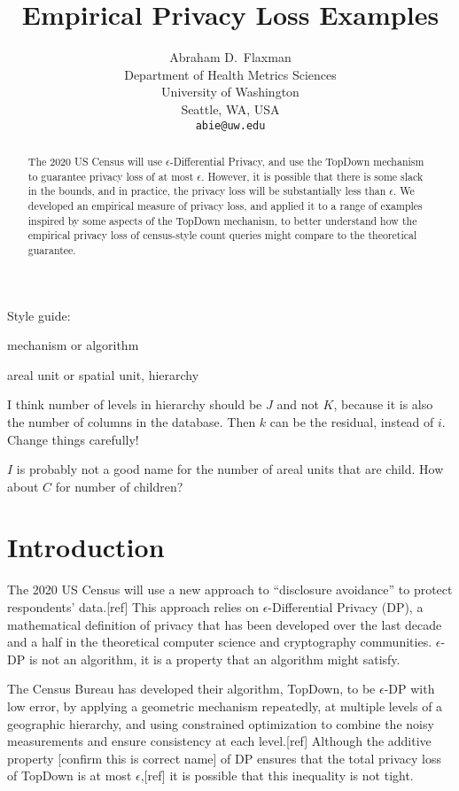 \documentclass{article}
\title{Empirical Privacy Loss Examples}
\author{%
  Abraham D.~Flaxman \\
  Department of Health Metrics Sciences\\
  University of Washington\\
  Seattle, WA, USA \\
  \texttt{abie@uw.edu} \\
}
\begin{document}
\maketitle

\begin{abstract}
  The 2020 US Census will use $\epsilon$-Differential Privacy, and use the TopDown mechanism to guarantee privacy loss of at most $\epsilon$.  However, it is possible that there is some slack in the bounds, and in practice, the privacy loss will be substantially less than $\epsilon$.  We developed an empirical measure of privacy loss, and applied it to a range of examples inspired by some aspects of the TopDown mechanism, to better understand how the empirical privacy loss of census-style count queries might compare to the theoretical guarantee.
\end{abstract}

Style guide:

mechanism or algorithm

areal unit or spatial unit, hierarchy

I think number of levels in hierarchy should be $J$ and not $K$, because it is also the number of columns in the database.  Then $k$ can be the residual, instead of $i$.  Change things carefully!

$I$ is probably not a good name for the number of areal units that are child.  How about $C$ for number of children?


\section{Introduction}

The 2020 US Census will use a new approach to “disclosure avoidance” to protect respondents’ data.[ref] This approach relies on $\epsilon$-Differential Privacy (DP), a mathematical definition of privacy that has been developed over the last decade and a half in the theoretical computer science and cryptography communities. $\epsilon$-DP is not an algorithm, it is a property that an algorithm might satisfy.

The Census Bureau has developed their algorithm, TopDown, to be $\epsilon$-DP with low error, by applying a geometric mechanism repeatedly, at multiple levels of a geographic hierarchy, and using constrained optimization to combine the noisy measurements and ensure consistency at each level.[ref]  Although the additive property [confirm this is correct name] of DP ensures that the total privacy loss of TopDown is at most $\epsilon$,[ref] it is possible that this inequality is not tight.\cite{hasselmo}
\end{document}
